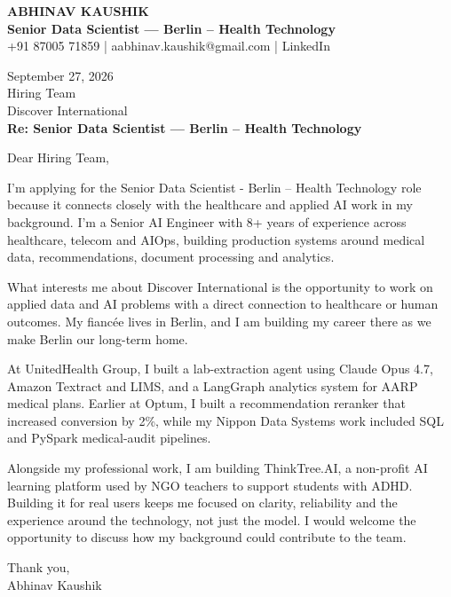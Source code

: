\documentclass[10pt,a4paper]{article}
\begin{document}
\begin{center}
{\Large\bfseries ABHINAV KAUSHIK}\\[2pt]
{\bfseries Senior Data Scientist — Berlin – Health Technology}\\[2pt]
+91 87005 71859 \quad | \quad aabhinav.kaushik@gmail.com \quad | \quad LinkedIn
\end{center}
\vspace{8pt}
September 27, 2026\\[6pt]
Hiring Team\\
Discover International\\[4pt]
\textbf{Re: Senior Data Scientist — Berlin – Health Technology}

Dear Hiring Team,

I’m applying for the Senior Data Scientist - Berlin – Health Technology role because it connects closely with the healthcare and applied AI work in my background. I’m a Senior AI Engineer with 8+ years of experience across healthcare, telecom and AIOps, building production systems around medical data, recommendations, document processing and analytics.

What interests me about Discover International is the opportunity to work on applied data and AI problems with a direct connection to healthcare or human outcomes. My fiancée lives in Berlin, and I am building my career there as we make Berlin our long-term home.

At UnitedHealth Group, I built a lab-extraction agent using Claude Opus 4.7, Amazon Textract and LIMS, and a LangGraph analytics system for AARP medical plans. Earlier at Optum, I built a recommendation reranker that increased conversion by 2\%, while my Nippon Data Systems work included SQL and PySpark medical-audit pipelines.

Alongside my professional work, I am building ThinkTree.AI, a non-profit AI learning platform used by NGO teachers to support students with ADHD. Building it for real users keeps me focused on clarity, reliability and the experience around the technology, not just the model. I would welcome the opportunity to discuss how my background could contribute to the team.

Thank you,\\
Abhinav Kaushik
\end{document}

